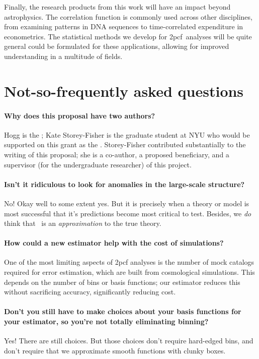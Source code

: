 \documentclass[12pt, fullpage, letterpaper]{article}
\newcommand{\cf}{2pcf\xspace}
\begin{document}
Finally, the research products from this work will have an impact beyond astrophysics.
The correlation function is commonly used across other disciplines, from examining patterns in DNA sequences to time-correlated expenditure in econometrics.
The statistical methods we develop for \cf\ analyses will be quite general could be formulated for these applications, allowing for improved understanding in a multitude of fields.

\section{Not-so-frequently asked questions}

\paragraph{Why does this proposal have two authors?}
Hogg is the \PI; Kate Storey-Fisher is the graduate student at NYU who would be supported on this grant as the \GRA.
Storey-Fisher contributed substantially to the writing of this proposal; she is a co-author, a proposed beneficiary, and a supervisor (for the undergraduate researcher) of this project.

\paragraph{Isn't it ridiculous to look for anomalies in the large-scale structure?}
No! Okay well to some extent yes. But it is precisely when a theory or model is most successful that it's predictions become most critical to test. Besides, we \emph{do} think that \LCDM\ is an \emph{approximation} to the true theory.

\paragraph{How could a new estimator help with the cost of simulations?}
One of the most limiting aspects of \cf analyses is the number of mock catalogs required for error estimation, which are built from cosmological simulations. This depends on the number of bins or basis functions; our estimator reduces this without sacrificing accuracy, significantly reducing cost.

\paragraph{Don't you still have to make choices about your basis functions for your estimator, so you're not totally eliminating binning?}
Yes! There are still choices. But those choices don't require hard-edged bins, and don't require that we approximate smooth functions with clunky boxes.
\end{document}
